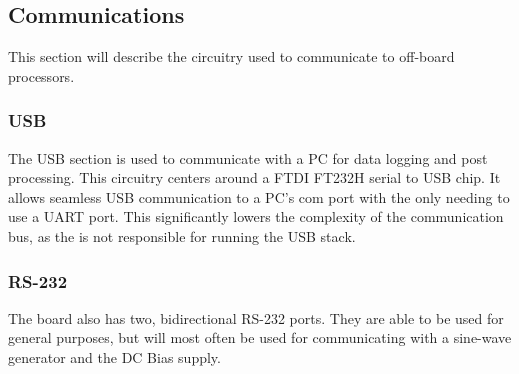 \subsection{Communications}

This section will describe the circuitry used to communicate to off-board processors.

\subsubsection{USB}
The USB section is used to communicate with a PC for data logging and post processing. This circuitry centers around a FTDI FT232H serial to USB chip. It allows seamless USB communication to a PC's com port with the  only needing to use a UART port. This significantly lowers the complexity of the communication bus, as the  is not responsible for running the USB stack.

\subsubsection{RS-232}
The board also has two, bidirectional RS-232 ports. They are able to be used for general purposes, but will most often be used for communicating with a sine-wave generator and the DC Bias supply.

